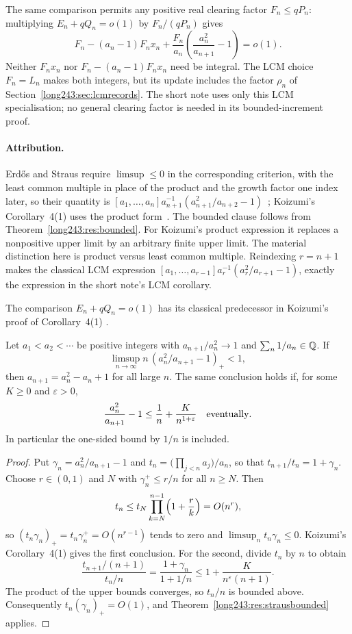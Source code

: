\documentclass[11pt]{article}
\begin{document}
The same comparison permits any positive real clearing factor
$F_n\le qP_n$: multiplying $E_n+qQ_n=o(1)$ by $F_n/(qP_n)$ gives
\[
 F_n-(a_n-1)F_nx_n+
 \frac{F_n}{a_n}\left(\frac{a_n^2}{a_{n+1}}-1\right)=o(1).
\]
Neither $F_nx_n$ nor $F_n-(a_n-1)F_nx_n$ need be integral. The LCM
choice $F_n=L_n$ makes both integers, but its update includes the
factor $\rho_n$ of Section~\ref{long243:sec:lcmrecords}. The short note
uses only this LCM specialisation; no general clearing factor is
needed in its bounded-increment proof.

\paragraph{Attribution.}
Erd\H{o}s and Straus require $\limsup\le0$ in the corresponding criterion, with
the least common multiple in place of the product and the growth factor one
index later, so their quantity is
$[a_1,\ldots,a_n]a_{n+1}^{-1}(a_{n+1}^{2}/a_{n+2}-1)$~\cite[Theorem~3,
p.~132]{erdosstraus1964}; Koizumi's Corollary~4(1) uses the product
form~\cite[Cor.~4(1), pp.~14--15]{koizumi2025}.  The bounded clause follows from
Theorem~\ref{long243:res:bounded}. For Koizumi's product expression it
replaces a nonpositive upper limit by an arbitrary finite upper limit.
The material distinction here is product versus least common multiple.
Reindexing $r=n+1$ makes the classical LCM expression
$[a_1,\ldots,a_{r-1}]a_r^{-1}(a_r^2/a_{r+1}-1)$, exactly the expression
in the short note's LCM corollary.

The comparison $E_n+qQ_n=o(1)$ has its classical predecessor in
Koizumi's proof of Corollary~4(1) \cite[(11)--(12), p.~15]{koizumi2025}.

\begin{corollary}\label{long243:res:onethreshold}
Let $a_1<a_2<\cdots$ be positive integers with $a_{n+1}/a_n^2\to1$
and $\sum_n1/a_n\in\mathbb{Q}$. If
\[
 \limsup_{n\to\infty} n\,(a_n^2/a_{n+1}-1)_+<1,
\]
then $a_{n+1}=a_n^2-a_n+1$ for all large $n$. The same conclusion holds if, for some $K\ge0$ and $\varepsilon>0$,
\[
 \frac{a_n^2}{a_{n+1}}-1\le\frac1n+\frac{K}{n^{1+\varepsilon}}
 \quad\hbox{eventually}.
\]
In particular the one-sided bound by $1/n$ is included.
\end{corollary}

\begin{proof}
Put $\gamma_n=a_n^2/a_{n+1}-1$ and $t_n=\bigl(\prod_{j<n}a_j\bigr)/a_n$, so
that $t_{n+1}/t_n=1+\gamma_n$.  Choose $r\in(0,1)$ and $N$ with
$\gamma_n^{+}\le r/n$ for all $n\ge N$.  Then
\[
 t_n\le t_N\prod_{k=N}^{n-1}\Bigl(1+\frac rk\Bigr)=O(n^{r}),
\]
so $(t_n\gamma_n)_+=t_n\gamma_n^{+}=O(n^{r-1})$ tends to zero and
$\limsup_nt_n\gamma_n\le0$.  Koizumi's Corollary~4(1)
\cite[pp.~14--15]{koizumi2025} gives the first conclusion.
For the second, divide $t_n$ by $n$ to obtain
\[
 \frac{t_{n+1}/(n+1)}{t_n/n}
 =\frac{1+\gamma_n}{1+1/n}
 \le 1+\frac{K}{n^\varepsilon(n+1)}.
\]
The product of the upper bounds converges, so $t_n/n$ is bounded above.
Consequently $t_n(\gamma_n)_+=O(1)$, and
Theorem~\ref{long243:res:strausbounded} applies.
\end{proof}
\end{document}
